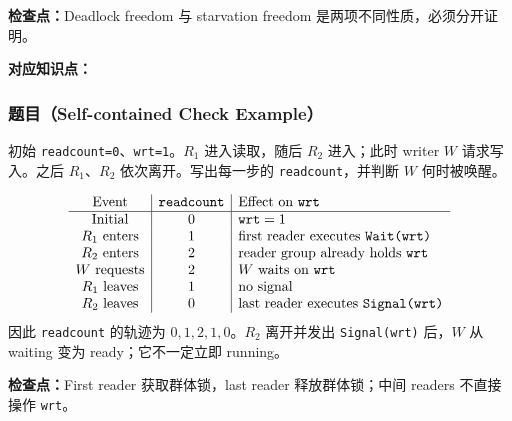 \textbf{检查点：}Deadlock freedom 与 starvation freedom 是两项不同性质，必须分开证明。


\textbf{对应知识点：}

\subsubsection*{题目（Self-contained Check Example）}

初始 \texttt{readcount=0}、\texttt{wrt=1}。$R_1$ 进入读取，随后 $R_2$ 进入；此时 writer $W$ 请求写入。之后 $R_1$、$R_2$ 依次离开。写出每一步的 \texttt{readcount}，并判断 $W$ 何时被唤醒。

\begin{checkedsolution}
\[
\begin{array}{c|c|l}
  \text{Event} & \texttt{readcount} & \text{Effect on \texttt{wrt}}\\
  \hline
  \text{Initial} & 0 & \texttt{wrt}=1\\
  R_1\text{ enters} & 1 & \text{first reader executes \texttt{Wait(wrt)}}\\
  R_2\text{ enters} & 2 & \text{reader group already holds \texttt{wrt}}\\
  W\text{ requests} & 2 & W\text{ waits on \texttt{wrt}}\\
  R_1\text{ leaves} & 1 & \text{no signal}\\
  R_2\text{ leaves} & 0 & \text{last reader executes \texttt{Signal(wrt)}}
\end{array}
\]
因此 \texttt{readcount} 的轨迹为 $0,1,2,1,0$。$R_2$ 离开并发出 \texttt{Signal(wrt)} 后，$W$ 从 waiting 变为 ready；它不一定立即 running。
\end{checkedsolution}

\textbf{检查点：}First reader 获取群体锁，last reader 释放群体锁；中间 readers 不直接操作 \texttt{wrt}。

